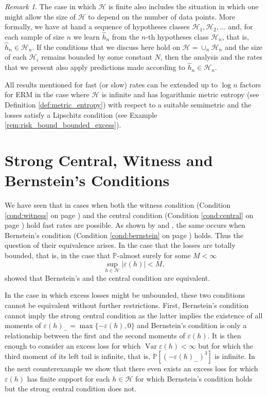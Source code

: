 \documentclass{uvamath}
\newcommand*{\calH}{\mathcal{H}}
\newcommand*{\bbP}{\mathbb{P}}
\DeclareMathOperator{\var}{Var}
\theoremstyle{remark}
\newtheorem{remark}[theorem]{Remark}
\theoremstyle{definition}
\theoremstyle{definition}
\theoremstyle{definition}
\theoremstyle{definition}
\theoremstyle{definition}
\begin{document}
\begin{remark}\label{rem:finite_classes}
  The case in which $\calH$ is finite also includes the situation in
  which one might allow the size of $\calH$ to depend on the number of
  data points. More formally, we have at hand a sequence of hypotheses
  classes $\calH_1,\calH_2,\dots$ and, for each sample of size $n$ we
  learn $\hat{h}_n$ from the $n$-th hypotheses class $\calH_n$, that
  is, $\hat{h}_n\in\calH_n$. If the conditions that we discuss here
  hold on $\calH = \cup_n\calH_n$ and the size of each $\calH_i$
  remains bounded by some constant $N$, then the analysis and the
  rates that we present also apply predictions made according to
  $\hat{h}_n\in\calH_n$.

  All results mentioned for fast (or slow) rates can be extended up to
  $\log n$ factors for ERM in the case where $\calH$ is infinite and
  has logarithmic metric entropy (see Definition \ref{def:metric_entropy})
  with respect to a suitable semimetric and the losses satisfy a
  Lipschitz condition (see Example
  \ref{rem:risk_bound_bounded_excess}).
\end{remark}

\section{Strong Central, Witness and Bernstein's Conditions \label{sect:central_witness_bernstein}}

We have seen that in cases when both the witness condition (Condition
\ref{cond:witness} on page \pageref{cond:witness}) and the central
condition (Condition \ref{cond:central} on page
\pageref{cond:central}) hold fast rates are possible.  As shown by
\citet{audibert_fast_2009} and \citet{bartlett_empirical_2006}, the
same occurs when Bernstein's condition (Condition \ref{cond:bernstein}
on page \pageref{cond:bernstein}) holds.  Thus the question of their
equivalence arises. In the case that the losses are totally bounded,
that is, in the case that $\bbP$-almost surely for some $M<\infty$
\begin{equation*}
  \sup_{h\in\calH}|\varepsilon(h)| < M,
\end{equation*} \citet{van_erven_fast_2015} showed that Bernstein's and
the central condition are equivalent.

In the case in which excess losses might be unbounded, these two
conditions cannot be equivalent without further restrictions. First,
Bernstein's condition cannot imply the strong central condition as the
latter implies the existence of all moments of
$\varepsilon(h)_- = \max\{-\varepsilon(h), 0\}$ and Bernstein's
condition is only a relationship between the first and the second
moments of $\varepsilon(h)$. It is then enough to consider an excess
loss for which $\var \varepsilon(h)< \infty$ but for which the third
moment of its left tail is infinite, that is,
$\bbP[(-\varepsilon(h)_-)^3]$ is infinite. In the next counterexample
we show that there even exists an excess loss for which
$\varepsilon(h)$ has finite support for each $h\in\calH$ for which
Bernstein's condition holds but the strong central condition does not.
\end{document}
